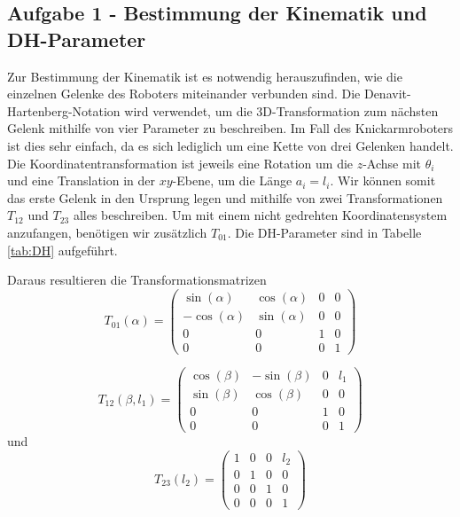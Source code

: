 \subsection*{Aufgabe 1 - Bestimmung der Kinematik und DH-Parameter}

Zur Bestimmung der Kinematik ist es notwendig herauszufinden, wie die einzelnen Gelenke des Roboters miteinander verbunden sind.
Die Denavit-Hartenberg-Notation wird verwendet, um die 3D-Transformation zum nächsten Gelenk mithilfe von vier Parameter zu beschreiben. Im Fall des Knickarmroboters ist
dies sehr einfach, da es sich lediglich um eine Kette von drei Gelenken handelt. Die Koordinatentransformation ist jeweils eine Rotation um die $z$-Achse mit $\theta_i$
und eine Translation in der $xy$-Ebene, um die Länge $a_i = l_i$. Wir können somit das erste Gelenk in den Ursprung legen und mithilfe von zwei Transformationen $T_{12}$ 
und $T_{23}$ alles beschreiben. Um mit einem nicht gedrehten Koordinatensystem anzufangen, benötigen wir zusätzlich $T_{01}$. Die DH-Parameter sind in Tabelle \ref{tab:DH} aufgeführt.



Daraus resultieren die Transformationsmatrizen
\begin{equation*}
	T_{01}(\alpha) = \begin{pmatrix}
	\sin(\alpha) & \cos(\alpha) & 0 & 0 \\
	-\cos(\alpha) & \sin(\alpha) & 0 & 0 \\
	0 & 0 & 1 & 0 \\
	0 & 0 & 0 & 1
	\end{pmatrix}
\end{equation*}
	
\begin{equation*}
	T_{12}(\beta, l_1) = \begin{pmatrix}
	\cos(\beta) & -\sin(\beta) & 0 & l_1 \\
	\sin(\beta) & \cos(\beta) & 0 & 0 \\
	0 & 0 & 1 & 0 \\
	0 & 0 & 0 & 1
	\end{pmatrix}
\end{equation*}
und
\begin{equation*}
	T_{23}(l_2) = \begin{pmatrix}
	1 & 0 & 0 & l_2 \\
	0 & 1 & 0 & 0 \\
	0 & 0 & 1 & 0 \\
	0 & 0 & 0 & 1
	\end{pmatrix}
\end{equation*}

